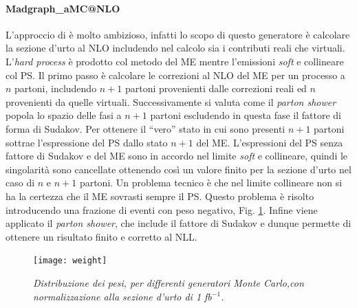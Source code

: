  
\paragraph{Madgraph\_aM{\footnotesize C@NLO}}
L'approccio di \aMC \cite{bib:madgraph} è molto ambizioso, infatti lo scopo di questo  generatore è  calcolare la sezione d'urto al NLO includendo nel calcolo sia  i contributi reali che virtuali. L'\textit{hard process} è prodotto col metodo del ME mentre l'emissioni \textit{soft} e collineare col PS.
Il primo passo è calcolare le correzioni al NLO del ME per un processo a $n$ partoni, includendo   $n+1$ partoni provenienti dalle correzioni reali ed  $n$ provenienti da quelle virtuali. Successivamente si valuta come il \textit{parton shower} popola lo spazio delle fasi a $n+1$ partoni  escludendo in questa fase il fattore di forma di Sudakov. Per ottenere il ``vero'' stato in cui  sono presenti $n+1$ partoni \aMC sottrae l'espressione del PS dallo stato $n+1$ del ME. L'espressioni del PS senza fattore di Sudakov e del  ME sono in accordo nel limite \textit{soft} e collineare, quindi le singolarità sono cancellate ottenendo così un valore finito per la sezione d'urto nel caso di $n$ e $n+1$ partoni.  Un problema tecnico è che nel limite collineare non si ha la certezza che il ME sovrasti sempre il PS. Questo problema è risolto introducendo una frazione di eventi con peso negativo, Fig. \ref{weight}.  Infine viene applicato il \textit{parton shower}, che  include il fattore di Sudakov e dunque permette di ottenere un risultato finito e corretto al NLL. 
 
 
 
 
 
\begin{figure}
\centering
\texttt{[image: weight]}
\caption{\textit{Distribuzione dei pesi, per differenti generatori Monte Carlo,con  normalizzazione alla sezione d'urto di 1 fb$^{-1}$.}}
\label{weight}
\end{figure}
 
 
